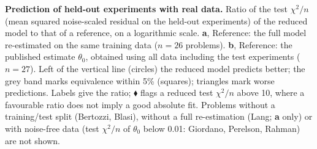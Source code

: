\caption{\textbf{Prediction of held-out experiments with real data.} Ratio of the test $\chi^2/n$ (mean squared noise-scaled residual on the held-out experiments) of the reduced model to that of a reference, on a logarithmic scale. \textbf{a}, Reference: the full model re-estimated on the same training data ($n=26$ problems). \textbf{b}, Reference: the published estimate $\theta_0$, obtained using all data including the test experiments ($n=27$). Left of the vertical line (circles) the reduced model predicts better; the grey band marks equivalence within 5\% (squares); triangles mark worse predictions. Labels give the ratio; $\blacklozenge$ flags a reduced test $\chi^2/n$ above 10, where a favourable ratio does not imply a good absolute fit. Problems without a training/test split (Bertozzi, Blasi), without a full re-estimation (Lang; \textbf{a} only) or with noise-free data (test $\chi^2/n$ of $\theta_0$ below 0.01: Giordano, Perelson, Rahman) are not shown.}
